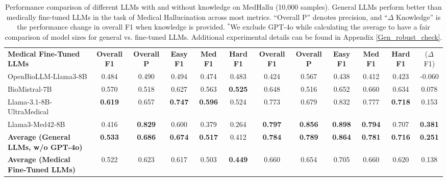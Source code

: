 \begin{table*}[t]
\begin{adjustbox}{width=1\linewidth, center}
\begin{tabular}{lccccc|ccccc|c}
    \midrule
    
    \textbf{Medical Fine-Tuned LLMs} & \textbf{Overall F1} & \textbf{Overall P} & \textbf{Easy F1} & \textbf{Med F1} & \textbf{Hard F1} 
                   & \textbf{Overall F1} & \textbf{Overall P} & \textbf{Easy F1} & \textbf{Med F1} & \textbf{Hard F1} & {($\Delta$ F1)}\\
    \cmidrule(lr){2-6} \cmidrule(lr){7-12}
    OpenBioLLM-Llama3-8B         & 0.484 & 0.490 & 0.494 & 0.474 & 0.483 & 0.424 & 0.567 & 0.438 & 0.412 & 0.423 & -0.060 \\
    BioMistral-7B                & 0.570 & 0.518 & 0.627 & 0.563 & \textbf{0.525} & 0.648 & 0.516 & 0.652 & 0.660 & 0.634 & 0.078 \\
    Llama-3.1-8B-UltraMedical    & \textbf{0.619} & 0.657 & \textbf{0.747} & \textbf{0.596} & 0.524 & 0.773 & 0.679 & 0.832 & 0.777 & \textbf{0.718} & 0.153 \\
    Llama3-Med42-8B & 0.416 & \textbf{0.829} & 0.600 & 0.379 & 0.264 & \textbf{0.797} & \textbf{0.856} & \textbf{0.898} & \textbf{0.794} & 0.707 & \textbf{0.381} \\
    \midrule
    \textbf{Average (General LLMs, w/o GPT-4o)} 
                                 & \textbf{0.533} & \textbf{0.686} & \textbf{0.674} & \textbf{0.517} & 0.412 
                                 & \textbf{0.784} & \textbf{0.789} & \textbf{0.864} & \textbf{0.781} & \textbf{0.716} 
                                 & \textbf{0.251} \\
    \textbf{Average (Medical Fine-Tuned LLMs)} 
                                 & 0.522 & 0.623 & 0.617 & 0.503 & \textbf{0.449} 
                                 & 0.660 & 0.654 & 0.705 & 0.660 & 0.620 
                                 & 0.138 \\
    \bottomrule
    \end{tabular}
    \end{adjustbox}
    \caption{Performance comparison of different LLMs with and without knowledge on MedHallu (10,000 samples). General LLMs perform better than medically fine-tuned LLMs in the task of Medical Hallucination across most metrics. “Overall P” denotes precision, and “\(\Delta\) Knowledge” is the performance change in overall F1 when knowledge is provided. $^*$We exclude GPT-4o while calculating the average to have a fair comparison of model sizes for general vs. fine-tuned LLMs. Additional experimental details can be found in Appendix \ref{Gen_robust_check}.}
    \label{tab:llm_performance_merged}
\end{table*}